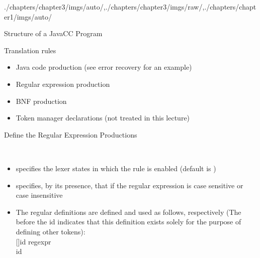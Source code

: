 \begin{graphicspathcontext}{{./chapters/chapter3/imgs/auto/},{./chapters/chapter3/imgs/raw/},{./chapters/chapter1/imgs/auto/}}
\begin{bibunit}[apalike]
\begin{frame}[t,fragile]{Structure of a JavaCC Program}
\begin{small}
{\begin{block}{Translation rules}
\begin{itemize}
		\item Java code production (see error recovery for an example)
		\item Regular expression production
		\item BNF production
		\item Token manager declarations (not treated in this lecture)
		\end{itemize}
	\end{block}}
	\end{small}
\end{frame}

\begin{frame}{Define the Regular Expression Productions}
	\begin{definition}
		 \\
	\end{definition}
	\begin{itemize}
	\item {} specifies the lexer states in which the rule is enabled (default is )
	\item {} specifies, by its presence, that if the regular expression is case sensitive or case insensitive
	\item The regular definitions are defined and used as follows, respectively (The  before the id indicates that this definition exists solely for the purpose of defining other tokens): \\
		\bnfts{\textless} [\bnfts{\#}]id \bnfts{:} regexpr \bnfts{\textgreater} \\
		\bnfts{\textless}id\bnfts{\textgreater}
	\end{itemize}
\end{frame}


\end{bibunit}
\end{graphicspathcontext}
